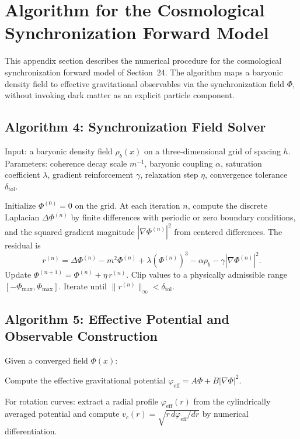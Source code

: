 \documentclass[11pt, a4paper, twocolumn]{article}
\begin{document}
{%
\section{Algorithm for the Cosmological Synchronization Forward Model}

This appendix section describes the numerical procedure for the cosmological
synchronization forward model of Section~24. The algorithm maps a baryonic
density field to effective gravitational observables via the synchronization
field $\Phi$, without invoking dark matter as an explicit particle component.

\subsection{Algorithm 4: Synchronization Field Solver}

Input: a baryonic density field $\rho_b(x)$ on a three-dimensional grid of
spacing $h$. Parameters: coherence decay scale $m^{-1}$, baryonic coupling
$\alpha$, saturation coefficient $\lambda$, gradient reinforcement $\gamma$,
relaxation step $\eta$, convergence tolerance $\delta_{\mathrm{tol}}$.

Initialize $\Phi^{(0)} = 0$ on the grid. At each iteration $n$, compute the
discrete Laplacian $\Delta\Phi^{(n)}$ by finite differences with periodic or
zero boundary conditions, and the squared gradient magnitude $|\nabla\Phi^{(n)}|^2$
from centered differences. The residual is
\[
r^{(n)}
=
\Delta\Phi^{(n)} - m^2\Phi^{(n)} + \lambda(\Phi^{(n)})^3
- \alpha\rho_b - \gamma|\nabla\Phi^{(n)}|^2.
\]
Update $\Phi^{(n+1)} = \Phi^{(n)} + \eta\,r^{(n)}$. Clip values to a
physically admissible range $[-\Phi_{\max},\Phi_{\max}]$. Iterate until
$\|r^{(n)}\|_\infty < \delta_{\mathrm{tol}}$.

\subsection{Algorithm 5: Effective Potential and Observable Construction}

Given a converged field $\Phi(x)$:

Compute the effective gravitational potential
$\varphi_{\mathrm{eff}} = A\Phi + B|\nabla\Phi|^2$.

For rotation curves: extract a radial profile $\varphi_{\mathrm{eff}}(r)$
from the cylindrically averaged potential and compute $v_c(r) =
\sqrt{r\,d\varphi_{\mathrm{eff}}/dr}$ by numerical differentiation.

}
\end{document}
